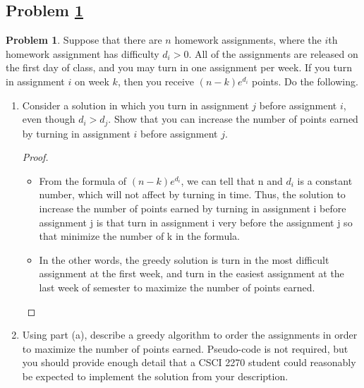 \documentclass[11pt]{article}
\theoremstyle{definition}
\theoremstyle{definition}
\newtheorem{required}{Problem}
\theoremstyle{definition}
\begin{document}
\subsection{Problem \ref{DFS1}}
\begin{required} \label{DFS1}
Suppose that there are $n$ homework assignments, where the $i$th homework assignment has difficulty $d_{i}>0$. All of the assignments are released on the first day of class, and you may turn in one assignment per week. If you turn in assignment $i$ on week $k$, then you receive $(n-k) e^{d_i}$ points. Do the following.

\begin{enumerate}[label=(\alph*)]
\item Consider a solution in which you turn in assignment $j$ before assignment $i$, even though $d_{i} > d_{j}$. Show that you can increase the number of points earned by turning in assignment $i$ before assignment $j$.

\begin{proof}
\begin{itemize}
\item From the formula of $ (n-k) e^{d_i}$, we can tell that n and $d_i$ is a constant number, which will not affect by turning in time. Thus, the solution to increase the number of points earned by turning in assignment i before assignment j is that turn in assignment i very before the assignment j so that minimize the number of k in the formula.
\item In the other words, the greedy solution is turn in the most difficult assignment at the first week, and turn in the easiest assignment at the last week of semester to maximize the number of points earned.
\end{itemize}
\end{proof}


\vskip 50pt
\item Using part (a), describe a greedy algorithm to order the assignments in order to maximize the number of points earned. Pseudo-code is not required, but you should provide enough detail that a CSCI 2270 student could reasonably be expected to implement the solution from your description.


\end{enumerate}
\end{required}
\end{document}
